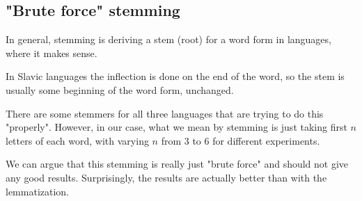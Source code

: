 \documentclass[11pt,letterpaper]{article}
\begin{document}
\subsection{"Brute force" stemming}
In general, stemming is deriving a stem (root) for a word form in languages, where it makes sense.

In Slavic languages the inflection is done on the end of the word, so the stem is usually some beginning of the word form, unchanged.

There are some stemmers for all three languages that are trying to do this "properly". However, in our case, what we mean by stemming is just taking first $n$ letters of each word, with varying $n$ from 3 to 6 for different experiments.

We can argue that this stemming is really just "brute force" and should not give any good results. Surprisingly, the results are actually better than with the lemmatization.

\end{document}
